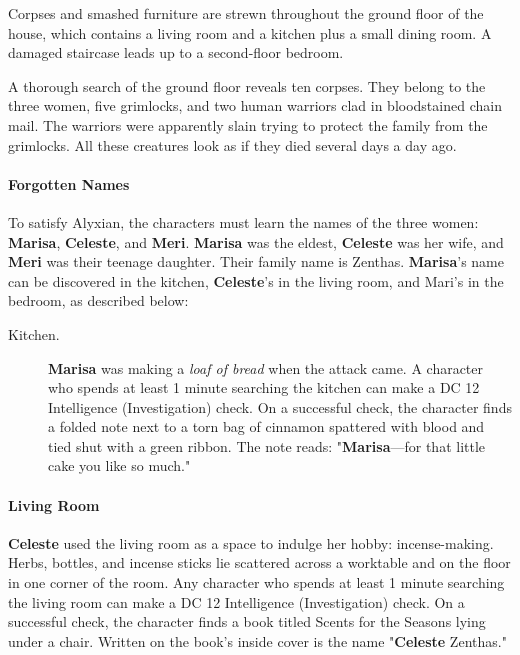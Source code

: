 \documentclass[a4paper, 11pt, bg=full, twocolumn, nooutline]{dndbook}
\begin{document}
\begin{DndReadAloud}
Corpses and smashed furniture are strewn throughout the ground floor of the house, which contains a living room and a kitchen plus a small dining room. A damaged staircase leads up to a second-floor bedroom.
\end{DndReadAloud}

A thorough search of the ground floor reveals ten corpses. They belong to the three women, five grimlocks, and two human warriors clad in bloodstained chain mail. The warriors were apparently slain trying to protect the family from the grimlocks. All these creatures look as if they died several days a day ago.

\paragraph{Forgotten Names}

To satisfy Alyxian, the characters must learn the names of the three women: \textbf{Marisa}, \textbf{Celeste}, and \textbf{Meri}. \textbf{Marisa} was the eldest, \textbf{Celeste} was her wife, and \textbf{Meri} was their teenage daughter. Their family name is Zenthas. \textbf{Marisa}'s name can be discovered in the kitchen, \textbf{Celeste}'s in the living room, and Mari's in the bedroom, as described below:

\begin{description}
\item[Kitchen.] \textbf{Marisa} was making a \textit{loaf of bread} when the attack came. A character who spends at least 1 minute searching the kitchen can make a DC 12 Intelligence (Investigation) check. On a successful check, the character finds a folded note next to a torn bag of cinnamon spattered with blood and tied shut with a green ribbon. The note reads: "\textbf{Marisa}---for that little cake you like so much."
\end{description}

\paragraph{Living Room}

\textbf{Celeste} used the living room as a space to indulge her hobby: incense-making. Herbs, bottles, and incense sticks lie scattered across a worktable and on the floor in one corner of the room. Any character who spends at least 1 minute searching the living room can make a DC 12 Intelligence (Investigation) check. On a successful check, the character finds a book titled Scents for the Seasons lying under a chair. Written on the book's inside cover is the name "\textbf{Celeste} Zenthas."
\end{document}
